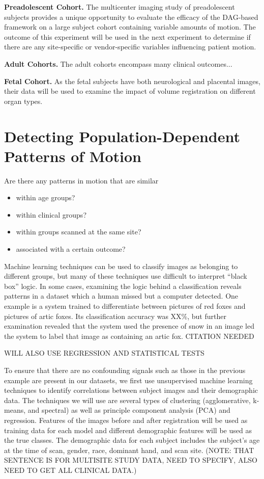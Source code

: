 \textbf{Preadolescent Cohort.} The multicenter imaging study of preadolescent subjects provides a unique opportunity to evaluate the efficacy of the DAG-based framework on a large subject cohort containing variable amounts of motion. The outcome of this experiment will be used in the next experiment to determine if there are any site-specific or vendor-specific variables influencing patient motion.

\textbf{Adult Cohorts.} The adult cohorts encompass many clinical outcomes...

\textbf{Fetal Cohort.} As the fetal subjects have both neurological and placental images, their data will be used to examine the impact of volume registration on different organ types.


\section{Detecting Population-Dependent Patterns of Motion} %

Are there any patterns in motion that are similar
\begin{itemize}
\item within age groups?
\item within clinical groups?
\item within groups scanned at the same site?
\item associated with a certain outcome?
\end{itemize}

Machine learning techniques can be used to classify images as belonging to different groups, but many of these techniques use difficult to interpret ``black box'' logic. In some cases, examining the logic behind a classification reveals patterns in a dataset which a human missed but a computer detected. One example is a system trained to differentiate between pictures of red foxes and pictures of artic foxes. Its classification accuracy was XX\%, but further examination revealed that the system used the presence of snow in an image led the system to label that image as containing an artic fox. CITATION NEEDED

WILL ALSO USE REGRESSION AND STATISTICAL TESTS

To ensure that there are no confounding signals such as those in the previous example are present in our datasets, we first use unsupervised machine learning techniques to identify correlations between subject images and their demographic data. The techniques we will use are several types of clustering (agglomerative, k-means, and spectral) as well as principle component analysis (PCA) and regression. Features of the images before and after registration will be used as training data for each model and different demographic features will be used as the true classes. The demographic data for each subject includes the subject's age at the time of scan, gender, race, dominant hand, and scan site. (NOTE: THAT SENTENCE IS FOR MULTISITE STUDY DATA, NEED TO SPECIFY, ALSO NEED TO GET ALL CLINICAL DATA.)

